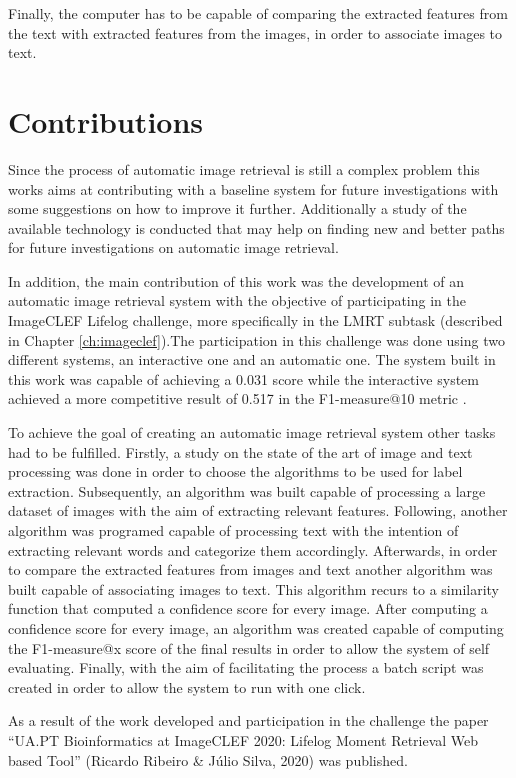 Finally, the computer has to be capable of comparing the extracted features from the text with extracted features from the images, in order to associate images to text.

\section{Contributions}

Since the process of automatic image retrieval is still a complex problem this works aims at contributing with a baseline system for future investigations with some suggestions on how to improve it further. Additionally a study of the available technology is conducted that may help on finding new and better paths for future investigations on automatic image retrieval.

In addition, the main contribution of this work was the development of an automatic image retrieval system with the objective of participating in the ImageCLEF Lifelog challenge, more specifically in the LMRT subtask (described in Chapter \ref{ch:imageclef}).The participation in this challenge was done using two different systems, an interactive one and an automatic one. The system built in this work was capable of achieving a 0.031 score while the interactive system achieved a more competitive result of 0.517 in the F1-measure@10 metric \cite{Ribeiro2020}.


To achieve the goal of creating an automatic image retrieval system other tasks had to be fulfilled. Firstly, a study on the state of the art of image and text processing was done in order to choose the algorithms to be used for label extraction. Subsequently, an algorithm was built capable of processing a large dataset of images  with the aim of extracting relevant features. Following, another algorithm was programed capable of processing text with the intention of extracting relevant words and categorize them accordingly. Afterwards, in order to compare the extracted features from images and text another algorithm was built capable of associating images to text. This algorithm recurs to a similarity function that computed a confidence score for every image. After computing a confidence score for every image, an algorithm was created capable of computing the F1-measure@x score of the final results in order to allow the system of self evaluating. Finally, with the aim of facilitating the process a batch script was created in order to allow the system to run with one click.

As a result of the work developed and participation in the challenge the paper ``UA.PT Bioinformatics at ImageCLEF 2020: Lifelog Moment Retrieval Web based Tool” (Ricardo Ribeiro \& Júlio Silva, 2020) was published.
